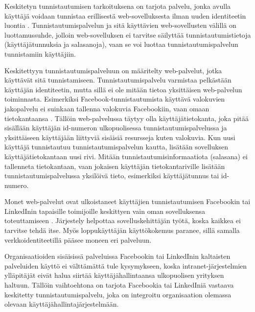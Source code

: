 Keskitetyn tunnistautumisen tarkoituksena on tarjota palvelu, jonka avulla käyttäjä voidaan tunnistaa erillisestä web-sovelluksesta ilman uuden identiteetin luontia \cite{facebook}. Tunnistautumispalvelun ja sitä käyttävien web-sovellusten välillä on luottamussuhde, jolloin web-sovelluksen ei tarvitse säilyttää tunnistautumistietoja (käyttäjätunnuksia ja salasanoja), vaan se voi luottaa tunnistautumispalvelun tunnistamiin käyttäjiin.

Keskitettyyn tunnistautumispalveluun on määritelty web-palvelut, jotka käyttävät sitä tunnistamiseen. Tunnistautumispalvelu varmistaa pelkästään käyttäjän identiteetin, mutta sillä ei ole mitään tietoa yksittäisen web-palvelun toiminnasta. Esimerkiksi Facebook-tunnistautumista käyttävä valokuvien jakopalvelu ei suinkaan tallenna valokuvia Facebookiin, vaan omaan tietokantaansa \cite{web_resources}. Tällöin web-palvelussa täytyy olla käyttäjätietokanta, joka pitää sisällään käyttäjän id-numeron ulkopuolisessa tunnistautumispalvelussa ja yksittäiseen käyttäjään liittyviä sisäisiä resursseja kuten valokuvia. Kun uusi käyttäjä tunnistautuu tunnistautumispalvelun kautta, lisätään sovelluksen käyttäjätietokantaan uusi rivi. Mitään tunnistautumisinformaatiota (salasana) ei tallenneta tietokantaan, vaan jokaisen käyttäjän tietokantariville lisätään tunnistautumispalvelussa yksilöivä tieto, esimerkiksi käyttäjätunnus tai id-numero.

Monet web-palvelut ovat ulkoistaneet käyttäjien tunnistautumisen Facebookin tai LinkedInin tapaisille toimijoille keskittyen vain oman sovelluksensa toteuttamiseen \cite{facebook}. Järjestely helpottaa sovelluskehittäjän työtä, koska kaikkea ei tarvitse tehdä itse. Myös loppukäyttäjän käyttökokemus paranee, sillä samalla verkkoidentiteetillä pääsee moneen eri palveluun.

Organisaatioiden sisäisissä palveluissa Facebookin tai LinkedInin kaltaisten palveluiden käyttö ei välttämättä tule kysymykseen, koska intranet-järjestelmien ylläpitäjät eivät halua siirtää käyttäjähallintaansa ulkopuolisen yrityksen haltuun. Tällöin vaihtoehtona on tarjota Facebookia tai LinkedIniä vastaava keskitetty tunnistautumispalvelu, joka on integroitu organisaation olemassa olevaan käyttäjähallintajärjestelmään.